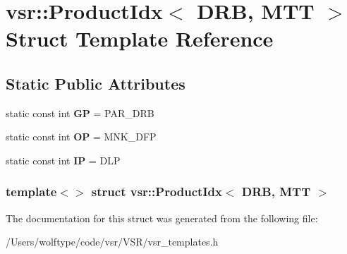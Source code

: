 \hypertarget{structvsr_1_1_product_idx_3_01_d_r_b_00_01_m_t_t_01_4}{\section{vsr\-:\-:Product\-Idx$<$ D\-R\-B, M\-T\-T $>$ Struct Template Reference}
\label{structvsr_1_1_product_idx_3_01_d_r_b_00_01_m_t_t_01_4}
}
\subsection*{Static Public Attributes}
\begin{DoxyCompactItemize}
\item 
\hypertarget{structvsr_1_1_product_idx_3_01_d_r_b_00_01_m_t_t_01_4_a1c8795f76db787b6f5afc104ba5d88c1}{static const int {\bfseries G\-P} = P\-A\-R\-\_\-\-D\-R\-B}\label{structvsr_1_1_product_idx_3_01_d_r_b_00_01_m_t_t_01_4_a1c8795f76db787b6f5afc104ba5d88c1}

\item 
\hypertarget{structvsr_1_1_product_idx_3_01_d_r_b_00_01_m_t_t_01_4_acbe8d7500335f5d852fbf5226c28f005}{static const int {\bfseries O\-P} = M\-N\-K\-\_\-\-D\-F\-P}\label{structvsr_1_1_product_idx_3_01_d_r_b_00_01_m_t_t_01_4_acbe8d7500335f5d852fbf5226c28f005}

\item 
\hypertarget{structvsr_1_1_product_idx_3_01_d_r_b_00_01_m_t_t_01_4_ae3ca1ad8febdcf6258072ee646a3d0ff}{static const int {\bfseries I\-P} = D\-L\-P}\label{structvsr_1_1_product_idx_3_01_d_r_b_00_01_m_t_t_01_4_ae3ca1ad8febdcf6258072ee646a3d0ff}

\end{DoxyCompactItemize}
\subsubsection*{template$<$$>$ struct vsr\-::\-Product\-Idx$<$ D\-R\-B, M\-T\-T $>$}



The documentation for this struct was generated from the following file\-:\begin{DoxyCompactItemize}
\item 
/\-Users/wolftype/code/vsr/\-V\-S\-R/vsr\-\_\-templates.\-h\end{DoxyCompactItemize}
